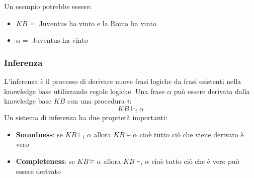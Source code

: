 \documentclass[a4paper]{article}
\begin{document}
\begin{example}
  Un esempio potrebbe essere:
  \begin{itemize}
    \item \( KB = \text{ Juventus ha vinto e la Roma ha vinto} \) 
    \item \( \alpha = \text{ Juventus ha vinto} \) 
  \end{itemize}
\end{example}

\subsubsection{Inferenza}
L'inferenza è il processo di derivare nuove frasi logiche da frasi esistenti
nella knowledge base utilizzando regole logiche. Una frase \( \alpha \) può essere
derivata dalla knowledge base \( KB \) con una procedura \( i \):
\[
  KB \vdash_i \alpha
\] 
Un sistema di inferenza ha due proprietà importanti:
\begin{itemize}
  \item \textbf{Soundness}: se \( KB \vdash_i \alpha \) allora \( KB \models \alpha \)
    cioè tutto ciò che viene derivato è vero
  \item \textbf{Completeness}: se \( KB \models \alpha \) allora \( KB \vdash_i \alpha \)
    cioè tutto ciò che è vero può essere derivato
\end{itemize}
\end{document}
